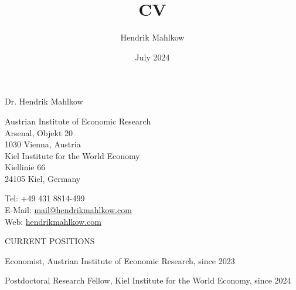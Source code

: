 \documentclass{article}
\title{CV}
\author{Hendrik Mahlkow}
\date{July 2024}
\begin{document}
{\selectfont 
	    \LARGE{Dr. Hendrik Mahlkow}
	}\\
\bigskip


\begin{minipage}[t]{0.66\textwidth}
    Austrian Institute of Economic Research \\
    Arsenal, Objekt 20 \\
    1030 Vienna, Austria \\
    \newline
    Kiel Institute for the World Economy \\
    Kiellinie 66 \\
    24105 Kiel, Germany
\end{minipage}
\hfill
\begin{minipage}[t]{0.33\textwidth} 
    Tel: +49 431 8814-499 \\
    E-Mail: \href{mailto:mail@hendrikmahlkow.com}{mail@hendrikmahlkow.com} \\
    Web: \href{http://hendrikmahlkow.com}{hendrikmahlkow.com} 
\end{minipage}
\bigskip
\bigskip


\begin{comment}
\begin{minipage}[t]{0.12\textwidth}
    {\fontfamily{phv}\selectfont ACADEMIC POSITION} \\
\end{minipage}
\hspace{5mm}
\begin{minipage}[t]{0.8\textwidth} 
    Researcher, Kiel Institute for the World Economy, since July 2019
\end{minipage}
\medskip
\end{comment}

\begin{minipage}[t]{0.12\textwidth}
    {\selectfont CURRENT POSITIONS} \\
\end{minipage}
\hspace{5mm}
\begin{minipage}[t]{0.8\textwidth} 
    Economist, Austrian Institute of Economic Research,  since 2023 \par
    Postdoctoral Research Fellow, Kiel Institute for the World Economy,  since 2024 \par
\end{minipage}
\medskip
\end{document}
